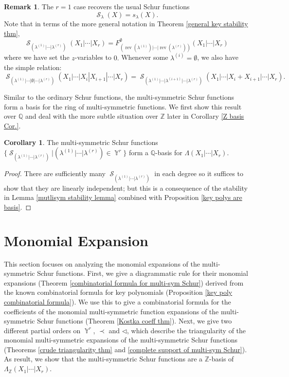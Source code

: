 \documentclass[12pt,reqno]{amsart}
\theoremstyle{definition}
\newtheorem{cor}[thm]{Corollary}
\newtheorem{remark}{Remark}
\DeclareMathOperator{\Par}{\mathbb{Y}}
\DeclareMathOperator{\rev}{rev}
\DeclareMathOperator{\cS}{\mathcal{S}}
\begin{document}
\begin{remark}
    The $r=1$ case recovers the usual Schur functions
    $$\cS_{\lambda}(X) = s_{\lambda}(X).$$ Note that in terms of the more general notation in Theorem \ref{general key stability thm},
    $$\cS_{(\lambda^{(1)}|\cdots |\lambda^{(r)})}(X_1|\cdots |X_r) = F^{\emptyset}_{(\rev(\lambda^{(1)})|\cdots |\rev(\lambda^{(r)}))}(X_1|\cdots|X_r)$$ where we have set the $z$-variables to $0.$ Whenever some $\lambda^{(i)} = \emptyset$, we also have the simple relation:
    $$\cS_{(\lambda^{(1)}|\cdots|\emptyset|\cdots|\lambda^{(r)})}(X_1|\cdots|X_i|X_{i+1}|
    \cdots|X_r) =\cS_{(\lambda^{(1)}|\cdots|\lambda^{(i+1)}|\cdots|\lambda^{(r)})}(X_1|\cdots|X_i+X_{i+1}|\cdots|X_r).$$
\end{remark}

Similar to the ordinary Schur functions, the multi-symmetric Schur functions form a basis for the ring of multi-symmetric functions. We first show this result over $\mathbb{Q}$ and deal with the more subtle situation over $\mathbb{Z}$ later in Corollary \ref{Z basis Cor.}. 

\begin{cor}
    The multi-symmetric Schur functions $\{\cS_{(\lambda^{(1)}|\cdots |\lambda^{(r)})}| (\lambda^{(1)}|\cdots |\lambda^{(r)})\in\Par^r\}$ form a $\mathbb{Q}$-basis for $\Lambda(X_1|\cdots|X_r).$
\end{cor}
\begin{proof}
    There are sufficiently many $\cS_{(\lambda^{(1)}|\cdots |\lambda^{(r)})}$ in each degree so it suffices to show that they are linearly independent; but this is a consequence of the stability in Lemma \ref{mutlisym stability lemma} combined with Proposition \ref{key polys are basis}.
\end{proof}



\section{Monomial Expansion}

This section focuses on analyzing the monomial expansions of the multi-symmetric Schur functions. First, we give a diagrammatic rule for their monomial expansions (Theorem \ref{combinatorial formula for multi-sym Schur}) derived from the known combinatorial formula for key polynomials (Proposition \ref{key poly combinatorial formula}). We use this to give a combinatorial formula for the coefficients of the monomial multi-symmetric function expansions of the multi-symmetric Schur functions (Theorem \ref{Kostka coeff thm}). Next, we give two different partial orders on $\Par^r$, $\prec$ and $\triangleleft$, which describe the triangularity of the monomial multi-symmetric expansions of the multi-symmetric Schur functions (Theorems \ref{crude triangularity thm} and \ref{complete support of multi-sym Schur}). As result, we show that the multi-symmetric Schur functions are a $\mathbb{Z}$-basis of $\Lambda_{\mathbb{Z}}(X_1|\cdots |X_r).$
\end{document}
